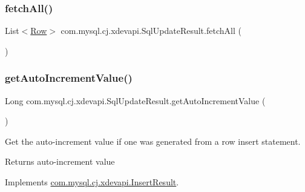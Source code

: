 \mbox{\label{classcom_1_1mysql_1_1cj_1_1xdevapi_1_1_sql_update_result_a24d25920523726a869eaf72532264996}} 
\subsubsection{\texorpdfstring{fetch\+All()}{fetchAll()}}
{\footnotesize\ttfamily List$<$\mbox{\hyperlink{interfacecom_1_1mysql_1_1cj_1_1result_1_1_row}{Row}}$>$ com.\+mysql.\+cj.\+xdevapi.\+Sql\+Update\+Result.\+fetch\+All (\begin{DoxyParamCaption}{ }\end{DoxyParamCaption})}

\mbox{\label{classcom_1_1mysql_1_1cj_1_1xdevapi_1_1_sql_update_result_a7c839bddddabb36231503575810e8a1d}} 
\subsubsection{\texorpdfstring{get\+Auto\+Increment\+Value()}{getAutoIncrementValue()}}
{\footnotesize\ttfamily Long com.\+mysql.\+cj.\+xdevapi.\+Sql\+Update\+Result.\+get\+Auto\+Increment\+Value (\begin{DoxyParamCaption}{ }\end{DoxyParamCaption})}

Get the auto-\/increment value if one was generated from a row insert statement.

\begin{DoxyReturn}{Returns}
auto-\/increment value 
\end{DoxyReturn}


Implements \mbox{\hyperlink{interfacecom_1_1mysql_1_1cj_1_1xdevapi_1_1_insert_result_a32144e23568f91aa21dab0b01cb6b14e}{com.\+mysql.\+cj.\+xdevapi.\+Insert\+Result}}.

